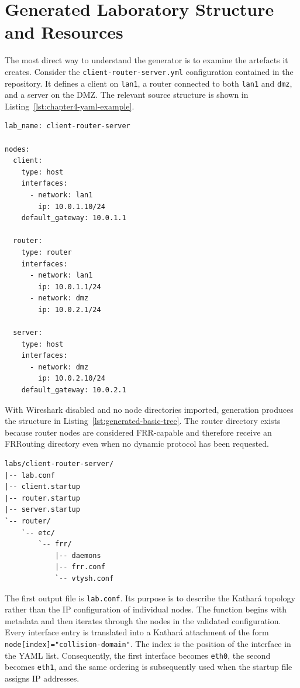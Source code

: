 \section{Generated Laboratory Structure and Resources}
\label{sec:generated-laboratory-structure}

The most direct way to understand the generator is to examine the artefacts it
creates. Consider the \texttt{client-router-server.yml} configuration contained
in the repository. It defines a client on \texttt{lan1}, a router connected to
both \texttt{lan1} and \texttt{dmz}, and a server on the DMZ. The relevant
source structure is shown in Listing~\ref{lst:chapter4-yaml-example}.

\begin{lstlisting}[caption={Extract from the client-router-server YAML configuration.},label={lst:chapter4-yaml-example}]
lab_name: client-router-server

nodes:
  client:
    type: host
    interfaces:
      - network: lan1
        ip: 10.0.1.10/24
    default_gateway: 10.0.1.1

  router:
    type: router
    interfaces:
      - network: lan1
        ip: 10.0.1.1/24
      - network: dmz
        ip: 10.0.2.1/24

  server:
    type: host
    interfaces:
      - network: dmz
        ip: 10.0.2.10/24
    default_gateway: 10.0.2.1
\end{lstlisting}

With Wireshark disabled and no node directories imported, generation produces
the structure in Listing~\ref{lst:generated-basic-tree}. The router directory
exists because router nodes are considered FRR-capable and therefore receive
an FRRouting directory even when no dynamic protocol has been requested.

\begin{lstlisting}[caption={Generated structure of the minimal routed laboratory.},label={lst:generated-basic-tree}]
labs/client-router-server/
|-- lab.conf
|-- client.startup
|-- router.startup
|-- server.startup
`-- router/
    `-- etc/
        `-- frr/
            |-- daemons
            |-- frr.conf
            `-- vtysh.conf
\end{lstlisting}

The first output file is \texttt{lab.conf}. Its purpose is to describe the
Kathar\'a topology rather than the IP configuration of individual nodes. The
function  begins with metadata and then iterates
through the nodes in the validated configuration. Every interface entry is
translated into a Kathar\'a attachment of the form
\texttt{node[index]="collision-domain"}. The index is the position of the
interface in the YAML list. Consequently, the first interface becomes
\texttt{eth0}, the second becomes \texttt{eth1}, and the same ordering is
subsequently used when the startup file assigns IP addresses.

